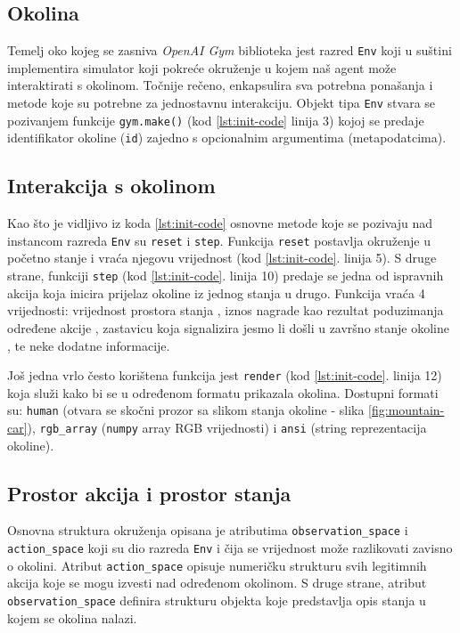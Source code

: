 \subsection{Okolina}

Temelj oko kojeg se zasniva \textit{OpenAI Gym} biblioteka jest razred  \texttt{Env} koji u suštini implementira simulator koji pokreće okruženje u kojem naš agent može interaktirati s okolinom. Točnije rečeno, enkapsulira sva potrebna ponašanja i metode koje su potrebne za jednostavnu interakciju. Objekt tipa \texttt{Env} stvara se pozivanjem funkcije \texttt{gym.make()} (kod \ref{lst:init-code} linija 3) kojoj se predaje identifikator okoline (\texttt{id}) zajedno s opcionalnim argumentima (metapodatcima). 

\subsection{Interakcija s okolinom}

Kao što je vidljivo iz koda \ref{lst:init-code} osnovne metode koje se pozivaju nad instancom razreda \texttt{Env} su \texttt{reset} i \texttt{step}. Funkcija \texttt{reset} postavlja okruženje u početno stanje i vraća njegovu vrijednost (kod \ref{lst:init-code}. linija 5). S druge strane, funkciji \texttt{step} (kod \ref{lst:init-code}. linija 10) predaje se jedna od ispravnih akcija koja inicira prijelaz okoline iz jednog stanja u drugo. Funkcija vraća 4 vrijednosti: vrijednost prostora stanja , iznos nagrade kao rezultat poduzimanja određene akcije  , zastavicu koja signalizira jesmo li došli u završno stanje okoline , te neke dodatne informacije.

Još jedna vrlo često korištena funkcija jest \texttt{render} (kod \ref{lst:init-code}. linija 12) koja služi kako bi se u određenom formatu prikazala okolina. Dostupni formati su: \texttt{human} (otvara se skočni prozor sa slikom stanja okoline - slika \ref{fig:mountain-car}), \texttt{rgb_array} (\texttt{numpy} array RGB vrijednosti) i \texttt{ansi} (string reprezentacija okoline).

\subsection{Prostor akcija i prostor stanja}

Osnovna struktura okruženja opisana je atributima \texttt{observation_space} i \texttt{actio\-n_space} koji su dio razreda \texttt{Env} i čija se vrijednost može razlikovati zavisno o okolini. Atribut \texttt{action_space} opisuje numeričku strukturu svih legitimnih akcija koje se mogu izvesti nad određenom okolinom. S druge strane, atribut \texttt{observation_s\-pace} definira strukturu objekta koje predstavlja opis stanja u kojem se okolina nalazi.

